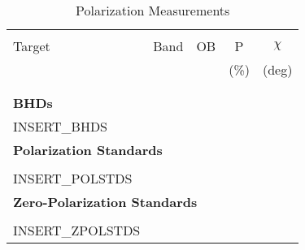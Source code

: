 \begin{table}
    \caption{\label{tab:pols} Polarization Measurements}
    \begin{tabular}{lclcc}
        \hline \hline\\
        Target & Band & OB &  P   & $\chi$ \\
               &      &    & (\%) &  (deg) \\
        \\
        \hline\\
        {\bf{BHDs}}\\
        INSERT_BHDS
        \\
        \multicolumn{5}{l}{\bf{Polarization Standards}}\\\\
        INSERT_POLSTDS
        \\
        \multicolumn{5}{l}{\bf{Zero-Polarization Standards}}\\\\
        INSERT_ZPOLSTDS
        \hline
    \end{tabular}
\end{table}        
